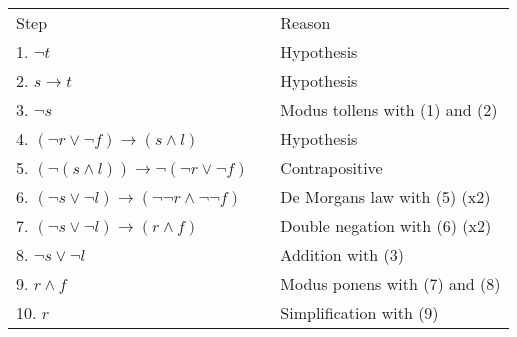 \documentclass[12pt,addpoints]{exam}
\begin{document}
\begin{questions}
\begin{solution}
    \begin{tabular}{lll}
        Step    & \hspace{0.2in} & Reason \\
        1. $\neg t$                 &       & Hypothesis \\
        2. $s \rightarrow t$        &       & Hypothesis \\
        3. $\neg s$                 &       & Modus tollens with (1) and (2) \\
        4. $(\neg r \vee \neg f) \rightarrow (s \wedge l)$  &   & Hypothesis \\
        5. $(\neg(s \wedge l)) \rightarrow \neg(\neg r \vee \neg f)$    & & Contrapositive \\
        6. $(\neg s \vee \neg l) \rightarrow (\neg \neg r \wedge \neg \neg f)$ & & De Morgans law with (5) (x2) \\
        7. $(\neg s \vee \neg l) \rightarrow (r \wedge f)$  & & Double negation with (6) (x2) \\
        8. $\neg s \vee \neg l$     &       & Addition with (3) \\
        9. $r \wedge f$             &       & Modus ponens with (7) and (8) \\
        10. $r$                     &       & Simplification with (9)
    \end{tabular}
\end{solution}
    
\end{questions}
\end{document}

